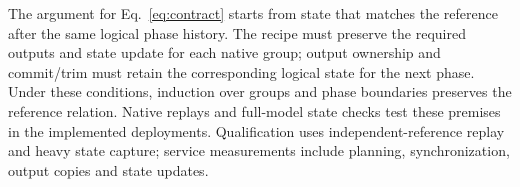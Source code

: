 The argument for Eq.~\eqref{eq:contract} starts from state that matches the reference after the same logical phase history. The recipe must preserve the required outputs and state update for each native group; output ownership and commit/trim must retain the corresponding logical state for the next phase. Under these conditions, induction over groups and phase boundaries preserves the reference relation. Native replays and full-model state checks test these premises in the implemented deployments. Qualification uses independent-reference replay and heavy state capture; service measurements include planning, synchronization, output copies and state updates.
